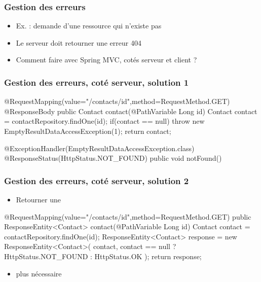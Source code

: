 \begin{frame}
 \frametitle{Gestion des erreurs}
 
 \begin{itemize}
  \item Ex. : demande d'une ressource qui n'existe pas
  \item Le serveur doit retourner une erreur 404
  \item Comment faire avec Spring MVC, cotés serveur et client ?
 \end{itemize}

\end{frame}

\begin{frame}[fragile]
 \frametitle{Gestion des erreurs, coté serveur, solution 1}
 
 \begin{javacode}
@RequestMapping(value="/contacts/{id}",method=RequestMethod.GET)
@ResponseBody
public Contact contact(@PathVariable Long id) {
  Contact contact = contactRepository.findOne(id);
  if(contact == null) {
    throw new EmptyResultDataAccessException(1);
  }
  return contact;
}

@ExceptionHandler(EmptyResultDataAccessException.class)
@ResponseStatus(HttpStatus.NOT_FOUND)
public void notFound() { }
 \end{javacode}

\end{frame}

\begin{frame}[fragile]
 \frametitle{Gestion des erreurs, coté serveur, solution 2}
 
 \begin{itemize}
  \item Retourner une 
 \end{itemize}
 
 \begin{javacode}
@RequestMapping(value="/contacts/{id}",method=RequestMethod.GET)
public ResponseEntity<Contact> contact(@PathVariable Long id) {
  Contact contact = contactRepository.findOne(id);
  ResponseEntity<Contact> response = new ResponseEntity<Contact>(
    contact,
    contact == null ? HttpStatus.NOT_FOUND : HttpStatus.OK
  );
  return response;
}  
 \end{javacode}
 
 \begin{itemize}
  \item {} plus nécessaire
 \end{itemize}

\end{frame}

